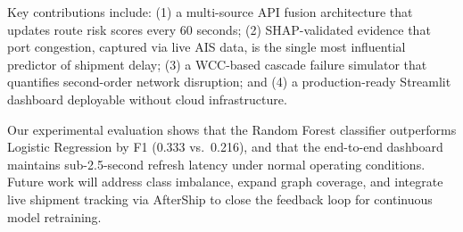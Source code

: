 \documentclass[conference]{IEEEtran}
\begin{document}
Key contributions include: (1) a multi-source API fusion architecture
that updates route risk scores every 60 seconds; (2) SHAP-validated
evidence that port congestion, captured via live AIS data, is the
single most influential predictor of shipment delay; (3) a WCC-based
cascade failure simulator that quantifies second-order network
disruption; and (4) a production-ready Streamlit dashboard deployable
without cloud infrastructure.

Our experimental evaluation shows that the Random Forest
classifier outperforms Logistic Regression by F1 (0.333 vs.\ 0.216),
and that the end-to-end dashboard maintains sub-2.5-second refresh
latency under normal operating conditions. Future work will address
class imbalance, expand graph coverage, and integrate live shipment
tracking via AfterShip to close the feedback loop for continuous
model retraining.
\end{document}
